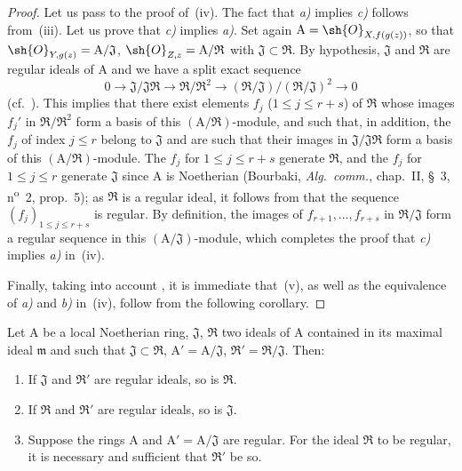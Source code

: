 \begin{proof}
Let us pass to the proof of~(iv).
The fact that \emph{a)} implies \emph{c)} follows from~(iii).
Let us prove that \emph{c)} implies \emph{a)}.
Set again $\mathrm{A}=\sh{O}_{X,f(g(z))}$, so that $\sh{O}_{Y,g(z)}=\mathrm{A}/\mathfrak{J}$,
$\sh{O}_{Z,z}=\mathrm{A}/\mathfrak{R}$ with $\mathfrak{J}\subset\mathfrak{R}$.
By hypothesis, $\mathfrak{J}$ and $\mathfrak{R}$ are regular ideals of $\mathrm{A}$ and we have a split exact sequence
\[
  0\to\mathfrak{J}/\mathfrak{J}\mathfrak{R}\to\mathfrak{R}/\mathfrak{R}^2\to(\mathfrak{R}/\mathfrak{J})/(\mathfrak{R}/\mathfrak{J})^2\to 0
\]
(cf.\ ).
This implies that there exist elements $f_j$ ($1\leq j\leq r+s$) of $\mathfrak{R}$ whose images $f_j'$ in $\mathfrak{R}/\mathfrak{R}^2$ form a basis of this $(\mathrm{A}/\mathfrak{R})$-module, and such that, in addition, the $f_j$ of index $j\leq r$ belong to $\mathfrak{J}$ and are such that their images in $\mathfrak{J}/\mathfrak{J}\mathfrak{R}$ form a basis of this $(\mathrm{A}/\mathfrak{R})$-module.
The $f_j$ for $1\leq j\leq r+s$ generate $\mathfrak{R}$, and the $f_j$ for $1\leq j\leq r$ generate $\mathfrak{J}$ since $\mathrm{A}$ is Noetherian (Bourbaki, \emph{Alg.\ comm.}, chap.~II, \S~3, n\textsuperscript{o}~2, prop.~5); as $\mathfrak{R}$ is a regular ideal, it follows from  that the sequence $(f_j)_{1\leq j\leq r+s}$ is regular.
By definition, the images of $f_{r+1},\ldots,f_{r+s}$ in $\mathfrak{R}/\mathfrak{J}$ form a regular sequence in this $(\mathrm{A}/\mathfrak{J})$-module, which completes the proof that \emph{c)} implies \emph{a)} in~(iv).

Finally, taking into account , it is immediate that~(v), as well as the equivalence of \emph{a)} and \emph{b)} in~(iv), follow from the following corollary.
\end{proof}

\begin{corollary}[19.1.6]
\label{IV.19.1.6}
Let $\mathrm{A}$ be a local Noetherian ring, $\mathfrak{J}$, $\mathfrak{R}$ two ideals of $\mathrm{A}$ contained in its maximal ideal $\mathfrak{m}$ and such that $\mathfrak{J}\subset\mathfrak{R}$, $\mathrm{A}'=\mathrm{A}/\mathfrak{J}$, $\mathfrak{R}'=\mathfrak{R}/\mathfrak{J}$.
Then:
\begin{enumerate}[label=(\roman*)]
  \item If $\mathfrak{J}$ and $\mathfrak{R}'$ are regular ideals, so is $\mathfrak{R}$.
  \item If $\mathfrak{R}$ and $\mathfrak{R}'$ are regular ideals, so is $\mathfrak{J}$.
  \item Suppose the rings $\mathrm{A}$ and $\mathrm{A}'=\mathrm{A}/\mathfrak{J}$ are regular.
For the ideal $\mathfrak{R}$ to be regular, it is necessary and sufficient that $\mathfrak{R}'$ be so.
\end{enumerate}
\end{corollary}

